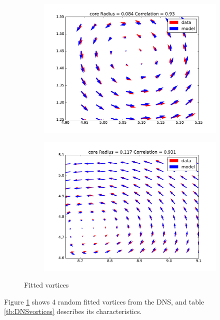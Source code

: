 \documentclass[12pt, a4paper, openany]{memoir}
\begin{document}
\begin{figure}[h!]
\begin{subfigure}[b]{0.45\textwidth}
		\includegraphics[trim=40 20 40 20 ,clip, width=\textwidth]{figure/dns_fit3.pdf}
		\caption{}
	\end{subfigure}
	\begin{subfigure}[b]{0.45\textwidth}
		\centering
		\includegraphics[trim=40 20 40 20 ,clip, width=\textwidth]{figure/dns_fit6.pdf}
		\caption{}
	\end{subfigure}
	\caption{Fitted vortices}
	\label{fig:vorticesDNS}
\end{figure}

Figure \ref{fig:vorticesDNS} shows 4 random fitted vortices from the DNS, and table \ref{tb:DNSvortices} describes its characteristics.
\end{document}
